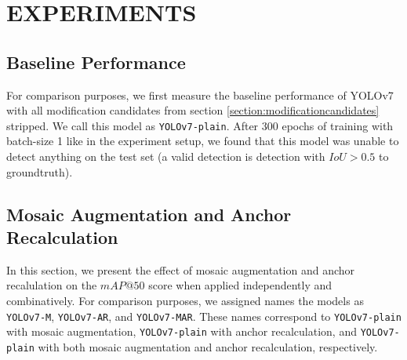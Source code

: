 \chapter{EXPERIMENTS}


\section{Baseline Performance}
For comparison purposes, we first measure the baseline performance of YOLOv7 with all
modification candidates from section \ref{section:modificationcandidates} stripped.
We call this model as \verb|YOLOv7-plain|.
After 300 epochs of training with batch-size 1 like in the experiment setup, we found that
this model was unable to detect anything on the test set (a valid detection is detection with $IoU>0.5$ to groundtruth). 
%

\section{Mosaic Augmentation and Anchor Recalculation}


In this section, we present the effect of mosaic augmentation and anchor recalulation on the $mAP@50$ score when applied
independently and combinatively. For comparison purposes, we assigned names the models as \verb|YOLOv7-M|,
\verb|YOLOv7-AR|, and \verb|YOLOv7-MAR|. These names correspond to \verb|YOLOv7-plain| with mosaic augmentation, \verb|YOLOv7-plain|
with anchor recalculation, and \verb|YOLOv7-plain| with both mosaic augmentation and anchor recalculation, respectively.

